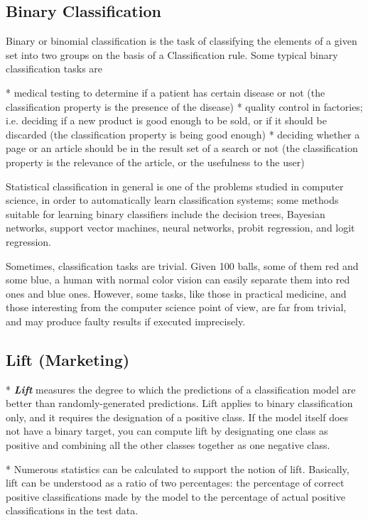 \subsection{Binary Classification}

Binary or binomial classification is the task of classifying the elements of a given set into two groups on the basis of a Classification rule. Some typical binary classification tasks are


*  medical testing to determine if a patient has certain disease or not (the classification property is the presence of the disease)
*  quality control in factories; i.e. deciding if a new product is good enough to be sold, or if it should be discarded (the classification property is being good enough)
*  deciding whether a page or an article should be in the result set of a search or not (the classification property is the relevance of the article, or the usefulness to the user)

Statistical classification in general is one of the problems studied in computer science, in order to automatically learn classification systems; some methods suitable for learning binary classifiers include the decision trees, Bayesian networks, support vector machines, neural networks, probit regression, and logit regression.

Sometimes, classification tasks are trivial. Given 100 balls, some of them red and some blue, a human with normal color vision can easily separate them into red ones and blue ones. However, some tasks, like those in practical medicine, and those interesting from the computer science point of view, are far from trivial, and may produce faulty results if executed imprecisely.


\subsection{Lift (Marketing) }

*  \textbf{\textit{Lift}} measures the degree to which the predictions of a classification model are better than randomly-generated predictions. Lift applies to binary classification only, and it requires the designation of a positive class. If the model itself does not have a binary target, you can compute lift by designating one class as positive and combining all the other classes together as one negative class.

*  Numerous statistics can be calculated to support the notion of lift. Basically, lift can be understood as a ratio of two percentages: the percentage of correct positive classifications made by the model to the percentage of actual positive classifications in the test data.

